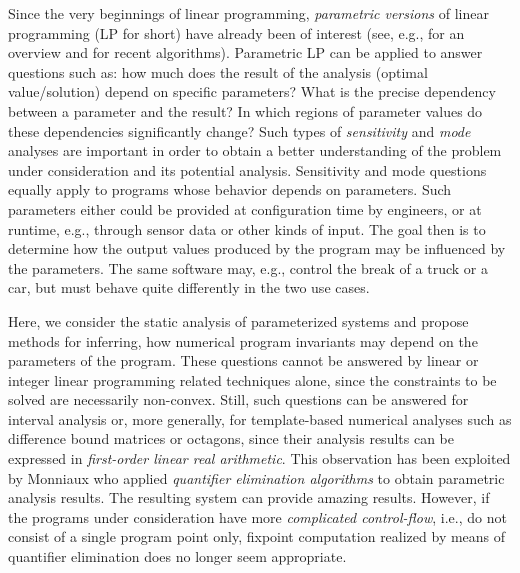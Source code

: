 \documentclass[a4paper]{easychair}
\begin{document}
Since the very beginnings of linear programming, 
\emph{parametric versions} of linear programming (LP for short) 
have already been of interest
(see, e.g., \cite{feautrier88,gal97} for an overview and \cite{holder11} for recent algorithms).
Parametric LP can be applied to answer questions
such as: how much does the result of the analysis (optimal value/solution) depend on specific parameters?
What is the precise dependency between a parameter and the result?
In which regions of parameter values do these dependencies significantly change?
Such types of \emph{sensitivity} and \emph{mode} analyses are important in order to obtain a better
understanding of the problem under consideration and its potential 
analysis.
Sensitivity and mode questions equally apply to
programs whose behavior depends on parameters. 
Such parameters either could be provided at configuration time by engineers,
or at runtime, e.g., through sensor data or other kinds of input. 
The goal then is to determine how the output values produced by the program
may be influenced by the parameters.
The same software may, e.g., control the break of a truck or a car, 
but must behave quite differently in the two use cases.



Here, we consider the static analysis of parameterized systems and
propose methods for inferring, how numerical program invariants
may depend on the parameters of the program.
These questions cannot be answered by linear or integer linear programming related techniques alone,
since the constraints to be solved are necessarily non-convex.
Still, such questions can be answered for interval analysis or,
more generally, for template-based numerical analyses such as difference bound matrices
or octagons, since their analysis results can be expressed in \emph{first-order linear real arithmetic}.
This observation has been exploited by Monniaux \cite{monniaux09} who applied \emph{quantifier elimination algorithms} to obtain parametric analysis results.
The resulting system can provide amazing results. 
However, 
if the programs under consideration have more \emph{complicated control-flow}, i.e., do not 
consist of a single program point only, 
fixpoint computation realized by means of quantifier elimination does no longer seem appropriate. 
\end{document}
